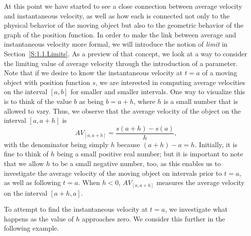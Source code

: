 
At this point we have started to see a close connection between average velocity and instantaneous velocity, as well as how each is connected not only to the physical behavior of the moving object but also to the geometric behavior of the graph of the position function.  In order to make the link between average and instantaneous velocity more formal, we will introduce the notion of \emph{limit} in Section~\ref{S:1.1.Limits}.  As a preview of that concept, we look at a way to consider the limiting value of average velocity through the introduction of a parameter.  Note that if we desire to know the instantaneous velocity at $t = a$ of a moving object with position function $s$, we are interested in computing average velocities on the interval $[a,b]$ for smaller and smaller intervals.  One way to visualize this is to think of the value $b$ as being $b = a + h$, where $h$ is a small number that is allowed to vary.  Thus, we observe that the average velocity of the object on the interval $[a,a+h]$ is
\[ AV_{[a,a+h]} = \frac{s(a+h)-s(a)}{h}, \]
with the denominator being simply $h$ because $(a+h) - a = h$.  Initially, it is fine to think of $h$ being a small positive real number; but it is important to note that we allow $h$ to be a small negative number, too, as this enables us to investigate the average velocity of the moving object on intervals prior to $t = a$, as well as following $t = a$.  When $h < 0$, $AV_{[a,a+h]}$ measures the average velocity on the interval $[a+h,a]$.  

To attempt to find the instantaneous velocity at $t = a$, we investigate what happens as the value of $h$ approaches zero.  We consider this further in the following example.



\clearpage

